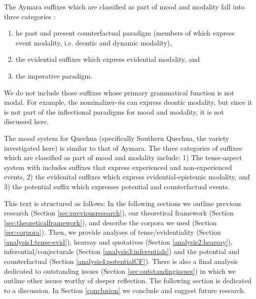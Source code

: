 \documentclass[output=paper,hidelinks]{langscibook}
\begin{document}
The Aymara suffixes which are classified as part of mood and modality fall into three categories \citep{coler2014grammar}: 
\begin{enumerate}
    \item he past and present counterfactual paradigm (members of which express event modality, i.e. deontic and dynamic modality),
    \item the evidential suffixes which express evidential modality, and
    \item the imperative paradigm.
\end{enumerate}
We do not include those suffixes whose primary grammatical function is not modal. For example, the nominalizer-\textit{ña} can express deontic modality, but since it is not part of the inflectional paradigms for mood and modality, it is not discussed here.

The mood system for Quechua (specifically Southern Quechua, the variety investigated here) is similar to that of Aymara. The three categories of suffixes which are classified as part of mood and modality include: 1) The tense-aspect system with includes suffixes that express experienced and non-experienced events, 2) the evidenital suffixes which express evidential-epistemic modality, and 3) the potential suffix which expresses potential and counterfactual events. 

This text is structured as follows: In the following sections we outline previous research (Section \ref{sec:previousresearch}), our theoretical framework (Section \ref{sec:theoreticalframework}), and describe the corpora we used (Section \ref{sec:corpora}). Then, we provide analyses of tense/evidentiality (Section \ref{analysis1:tense-evid}), hearsay and quotatives (Section \ref{analysis2:hearsay}), inferential/conjecturals (Section \ref{analysis3:inferentials}) and the potential and counterfactual (Section \ref{analysis4:potentialCF}). There is also a final analysis dedicated to outstanding issues (Section \ref{sec:outstandingissues}) in which we outline other issues worthy of deeper reflection. The following section is dedicated to a discussion. In Section \ref{conclusion} we conclude and suggest future research.
\end{document}
